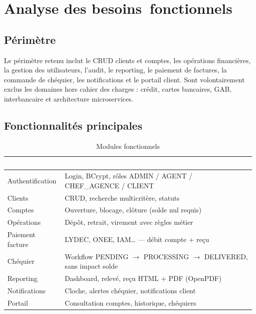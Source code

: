 \documentclass[11pt,a4paper,oneside]{report}
\newcommand{\tabhead}[1]{\textcolor{white}{\textbf{#1}}}
\begin{document}
\section{Analyse des besoins~fonctionnels}

\subsection{Périmètre}

Le périmètre retenu inclut le CRUD clients et comptes, les opérations financières, la gestion des utilisateurs, l'audit, le reporting, le paiement de factures, la commande de chéquier, les notifications et le portail client. Sont volontairement exclus les domaines hors cahier des charges : crédit, cartes bancaires, GAB, interbancaire et architecture microservices.

\subsection{Fonctionnalités principales}

\begin{table}[H]
    \centering
    \caption{Modules fonctionnels}
    \label{tab:fonctionnalites}
    \small
    \begin{tabular}{@{}p{3cm}p{9.5cm}@{}}
        \rowcolor{AmanaBrown}
        \tabhead{Module} & \tabhead{Description} \\
        \midrule
        Authentification & Login, BCrypt, rôles ADMIN / AGENT / CHEF\_AGENCE / CLIENT \\
        Clients & CRUD, recherche multicritère, statuts \\
        Comptes & Ouverture, blocage, clôture (solde nul requis) \\
        Opérations & Dépôt, retrait, virement avec règles métier \\
        Paiement facture & LYDEC, ONEE, IAM… — débit compte + reçu \\
        Chéquier & Workflow PENDING $\rightarrow$ PROCESSING $\rightarrow$ DELIVERED, sans impact solde \\
        Reporting & Dashboard, relevé, reçu HTML + PDF (OpenPDF) \\
        Notifications & Cloche, alertes chéquier, notifications client \\
        Portail & Consultation comptes, historique, chéquiers \\
        \bottomrule
    \end{tabular}
\end{table}
\end{document}
